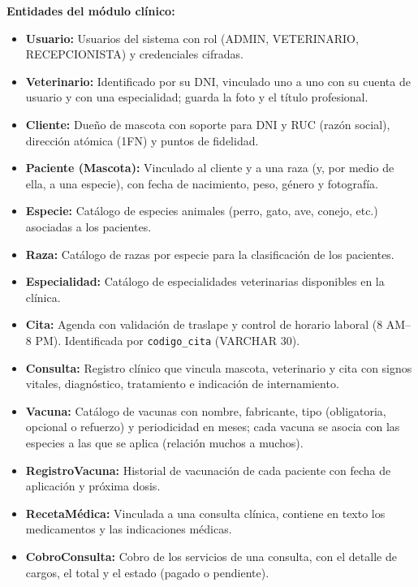 \documentclass[11pt,a4paper]{report}
\begin{document}
\textbf{Entidades del módulo clínico:}
\begin{itemize}
\item \textbf{Usuario:} Usuarios del sistema con rol (ADMIN, VETERINARIO, RECEPCIONISTA) y credenciales cifradas.
\item \textbf{Veterinario:} Identificado por su DNI, vinculado uno a uno con su cuenta de usuario y con una especialidad; guarda la foto y el título profesional.
\item \textbf{Cliente:} Dueño de mascota con soporte para DNI y RUC (razón social), dirección atómica (1FN) y puntos de fidelidad.
\item \textbf{Paciente (Mascota):} Vinculado al cliente y a una raza (y, por medio de ella, a una especie), con fecha de nacimiento, peso, género y fotografía.
\item \textbf{Especie:} Catálogo de especies animales (perro, gato, ave, conejo, etc.) asociadas a los pacientes.
\item \textbf{Raza:} Catálogo de razas por especie para la clasificación de los pacientes.
\item \textbf{Especialidad:} Catálogo de especialidades veterinarias disponibles en la clínica.
\item \textbf{Cita:} Agenda con validación de traslape y control de horario laboral (8 AM--8 PM). Identificada por \texttt{codigo\_cita} (VARCHAR 30).
\item \textbf{Consulta:} Registro clínico que vincula mascota, veterinario y cita con signos vitales, diagnóstico, tratamiento e indicación de internamiento.
\item \textbf{Vacuna:} Catálogo de vacunas con nombre, fabricante, tipo (obligatoria, opcional o refuerzo) y periodicidad en meses; cada vacuna se asocia con las especies a las que se aplica (relación muchos a muchos).
\item \textbf{RegistroVacuna:} Historial de vacunación de cada paciente con fecha de aplicación y próxima dosis.
\item \textbf{RecetaMédica:} Vinculada a una consulta clínica, contiene en texto los medicamentos y las indicaciones médicas.
\item \textbf{CobroConsulta:} Cobro de los servicios de una consulta, con el detalle de cargos, el total y el estado (pagado o pendiente).
\end{itemize}
\end{document}

